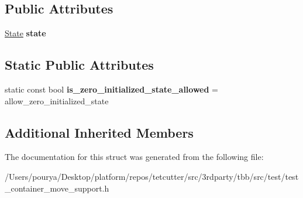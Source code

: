 \subsection*{Public Attributes}
\begin{DoxyCompactItemize}
\item 
\hypertarget{structHarness_1_1StateTrackable_a7a8e6b0f79e7cbd96ba87225c7a0a8c6}{}\hyperlink{structState}{State} {\bfseries state}\label{structHarness_1_1StateTrackable_a7a8e6b0f79e7cbd96ba87225c7a0a8c6}

\end{DoxyCompactItemize}
\subsection*{Static Public Attributes}
\begin{DoxyCompactItemize}
\item 
\hypertarget{structHarness_1_1StateTrackable_a3f359845c0dc149929a3c9908d556778}{}static const bool {\bfseries is\+\_\+zero\+\_\+initialized\+\_\+state\+\_\+allowed} = allow\+\_\+zero\+\_\+initialized\+\_\+state\label{structHarness_1_1StateTrackable_a3f359845c0dc149929a3c9908d556778}

\end{DoxyCompactItemize}
\subsection*{Additional Inherited Members}


The documentation for this struct was generated from the following file\+:\begin{DoxyCompactItemize}
\item 
/\+Users/pourya/\+Desktop/platform/repos/tetcutter/src/3rdparty/tbb/src/test/test\+\_\+container\+\_\+move\+\_\+support.\+h\end{DoxyCompactItemize}
